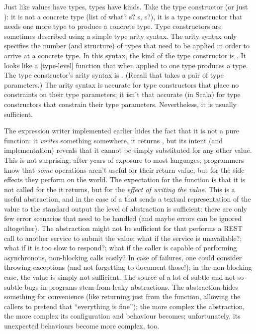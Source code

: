 \documentclass[10 pt]{article}
\begin{document}
Just like values have types, types have kinds. Take the type constructor  (or just ): it is not a concrete type (list of what? s? s, s?), it is a type constructor that needs one more type to produce a concrete type. Type constructors are sometimes described using a simple type arity syntax. The arity syntax only specifies the number (and structure) of types that need to be applied in order to arrive at a concrete type. In this syntax, the kind of the  type constructor is \pcode{* -> *}. It looks like a [type-level] function that when applied to one type produces a type. The  type constructor's arity syntax is \pcode{(*, *) -> *}. (Recall that  takes a pair of type parameters.) The arity syntax is accurate for type constructors that place no constraints on their type parameters; it isn't that accurate (in Scala) for type constructors that constrain their type parameters. Nevertheless, it is usually sufficient.

The expression writer implemented earlier hides the fact that it is not a pure function: it \emph{writes} something somewhere, it returns , but its intent (and implementation) reveals that it cannot be simply substituted for any other \pcode{()} value. This is not surprising: after years of exposure to most languages, programmers know that \emph{some} operations aren't useful for their return value, but for the side-effects they perform on the world. The expectation for the  function is that it is not called for the \pcode{()} it returns, but for the \emph{effect of writing the value}. This is a useful abstraction, and in the case of a  that sends a textual representation of the value to the standard output the level of abstraction is sufficient: there are only few error scenarios that need to be handled (and maybe errors can be ignored altogether). The abstraction might not be sufficient for  that performs a REST call to another service to submit the value: what if the service is unavailable?; what if it is too slow to respond?; what if the caller is capable of performing asynchronous, non-blocking calls easily? In case of failures, one could consider throwing exceptions (and not forgetting to document those!); in the non-blocking case, the value \pcode{()} is simply not sufficient. The source of a lot of subtle and not-so-subtle bugs in programs stem from leaky abstractions. The abstraction hides something for convenience (like returning just \pcode{()} from the  function, allowing the callers to pretend that ``everything is fine''); the more complex the abstraction, the more complex its configuration and behaviour becomes; unfortunately, its unexpected behaviours become more complex, too.
\end{document}
